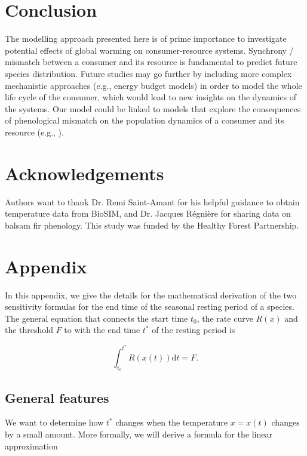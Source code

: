 \documentclass[12 pt]{article}
\begin{document}
\section{Conclusion}
The modelling approach presented here is of prime importance to investigate potential effects of global warming on consumer-resource systems. Synchrony / mismatch between a consumer and its resource is fundamental to predict future species distribution. Future studies may go further by including more complex mechanistic approaches (e.g., energy budget models) in order to model the whole life cycle of the consumer, which would lead to new insights on the dynamics of the systems. Our model could be linked to models that explore the consequences of phenological mismatch on the population dynamics of a consumer and its resource (e.g., \citep{Bewick2016}).

\section*{Acknowledgements}
Authors want to thank Dr. Remi Saint-Amant for his helpful guidance to obtain temperature data from BioSIM, and Dr. Jacques Régnière for sharing data on balsam fir phenology. This study was funded by the Healthy Forest Partnership. 

\clearpage



\clearpage

\section*{Appendix}
In this appendix, we give the details for the mathematical derivation of the two sensitivity formulas for the end time of the seasonal resting period of a species. The general equation that connects the start time $t_0$, the rate curve $R(x)$ and the threshold $F$ to with the end time $t^*$ of the resting period is

\begin{equation}
    \int _{t_0} ^{t^*} R(x(t)) \mathrm{d}t = F. \tag{Eq. \theequation}
\end{equation}

\subsection*{General features}
We want to determine how $t^*$ changes when the temperature $x = x(t)$ changes by a small amount. More formally, we will derive a formula for the linear approximation
\end{document}
